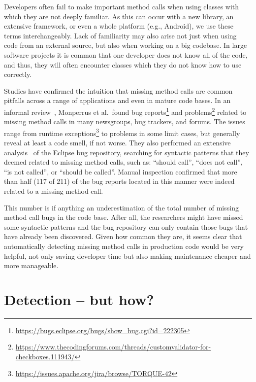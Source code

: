 Developers often fail to make important method calls when using classes with which they are not deeply familiar.
As this can occur with a new library, an extensive framework, or even a whole platform (e.g., Android), we use these terms interchangeably.
Lack of familiarity may also arise not just when using code from an external source, but also when working on a big codebase.
In large software projects it is common that one developer does not know all of the code, and thus, they will often encounter classes which they do not know how to use correctly.

Studies have confirmed the intuition that missing method calls are common pitfalls across a range of applications and even in mature code bases.
In an informal review~\cite{monperrus2010detecting}, Monperrus et al.\ found bug reports\footnote{\url{https://bugs.eclipse.org/bugs/show_bug.cgi?id=222305}} and problems\footnote{\url{https://www.thecodingforums.com/threads/customvalidator-for-checkboxes.111943/}} related to missing method calls in many newsgroups, bug trackers, and forums.
The issues range from runtime exceptions\footnote{\url{https://issues.apache.org/jira/browse/TORQUE-42}} to problems in some limit cases, but generally reveal at least a code smell, if not worse.
They also performed an extensive analysis~\cite{monperrus2013detecting} of the Eclipse bug repository,
searching for syntactic patterns that they deemed related to missing method calls, such as: ``should call'', ``does not call'', ``is not called'', or ``should be called''.
Manual inspection confirmed that more than half (117 of 211) of the bug reports located in this manner were indeed related to a missing method call.

This number is if anything an underestimation of the total number of missing method call bugs in the code base.
After all, the researchers might have missed some syntactic patterns and the bug repository can only contain those bugs that have already been discovered.
Given how common they are, it seems clear that automatically detecting missing method calls in production code would be very helpful, not only saving developer time but also making maintenance cheaper and more manageable.

\section{Detection -- but how?}

